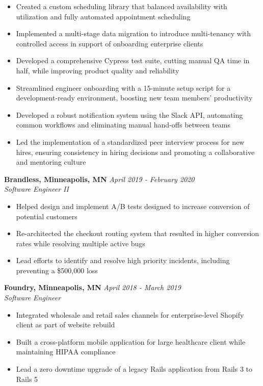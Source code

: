 \documentclass{res}
\begin{document}
\begin{resume}
			\begin{itemize} \itemsep -2pt
        \item Created a custom scheduling library that balanced availability with utilization and fully automated appointment scheduling
        \item Implemented a multi-stage data migration to introduce multi-tenancy with controlled access in support of onboarding enterprise clients
        \item Developed a comprehensive Cypress test suite, cutting manual QA time in half, while improving product quality and reliability
        \item Streamlined engineer onboarding with a 15-minute setup script for a development-ready environment, boosting new team members' productivity
        \item Developed a robust notification system using the Slack API, automating common workflows and eliminating manual hand-offs between teams
        \item Led the implementation of a standardized peer interview process for new hires, ensuring consistency in hiring decisions and promoting a collaborative and mentoring culture
			\end{itemize}

		{\bf Brandless, Minneapolis, MN} \hfill \emph{April 2019 - February 2020} \\
			\emph{Software Engineer II}

			\begin{itemize} \itemsep -2pt
				\item Helped design and implement A/B tests designed to increase conversion of potential customers
        \item Re-architected the checkout routing system that resulted in higher conversion rates while resolving multiple active bugs
        \item Lead efforts to identify and resolve high priority incidents, including preventing a \$500,000 loss
			\end{itemize}

		{\bf Foundry, Minneapolis, MN} \hfill \emph{April 2018 - March 2019} \\
			\emph{Software Engineer}

			\begin{itemize} \itemsep -2pt
				\item Integrated wholesale and retail sales channels for enterprise-level Shopify client as part of website rebuild
				\item Built a cross-platform mobile application for large healthcare client while maintaining HIPAA compliance
				\item Lead a zero downtime upgrade of a legacy Rails application from Rails 3 to Rails 5
			\end{itemize}


\end{resume}
\end{document}
